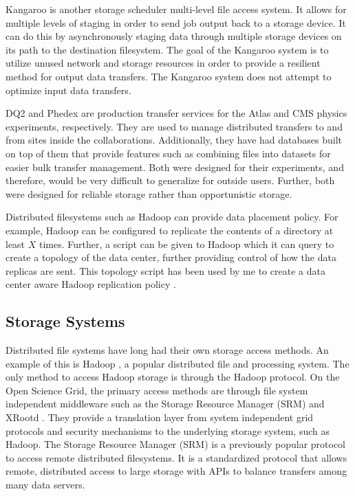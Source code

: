 Kangaroo \cite{thain2001kangaroo} is another storage scheduler multi-level file access system.  It allows for multiple levels of staging in order to send job output back to a storage device.  It can do this by asynchronously staging data through multiple storage devices on its path to the destination filesystem.  The goal of the Kangaroo system is to utilize unused network and storage resources in order to provide a resilient method for output data transfers.  The Kangaroo system does not attempt to optimize input data transfers.


DQ2 \cite{branco2008managing} and Phedex \cite{rehn2006phedex} are production transfer services for the Atlas and CMS physics experiments, respectively.  They are used to manage distributed transfers to and from sites inside the collaborations.  Additionally, they have had databases built on top of them that provide features such as combining files into datasets for easier bulk transfer management.  Both were designed for their experiments, and therefore, would be very difficult to generalize for outside users.  Further, both were designed for reliable storage rather than opportunistic storage.

Distributed filesystems such as Hadoop can provide data placement policy.  For example, Hadoop can be configured to replicate the contents of a directory at least $X$ times.  Further, a script can be given to Hadoop which it can query to create a topology of the data center, further providing control of how the data replicas are sent.  This topology script has been used by me to create a data center aware Hadoop replication policy \cite{he2012hog}.

\subsection{Storage Systems}

Distributed file systems have long had their own storage access methods.  An example of this is Hadoop \cite{white2012hadoop}, a popular distributed file and processing system.  The only method to access Hadoop storage is through the Hadoop protocol.  On the Open Science Grid, the primary access methods are through file system independent middleware such as the Storage Resource Manager (SRM) \cite{shoshani2002storage} and XRootd \cite{dorigo2005xrootd}.  They provide a translation layer from system independent grid protocols and security mechanisms to the underlying storage system, such as Hadoop.  The Storage Resource Manager (SRM) is a previously popular protocol to access remote distributed filesystems.  It is a standardized protocol that allows remote, distributed access to large storage with APIs to balance transfers among many data servers.


